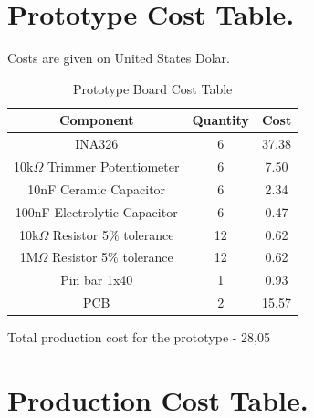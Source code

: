 \chapter{Prototype Cost Table.}

Costs are given on United States Dolar.\\
\begin{table}[htb]
  \begin{center}
    \ABNTEXreducedfont
    \caption[Prototype Board Cost Table]{Prototype Board Cost Table}
    \label{Prototype-cost}
    \begin{tabular}{c|c|c}
      \textbf{Component} & \textbf{Quantity} & \textbf{Cost} \\
    \hline
    \hline
    INA326 & 6 & 37.38\\ \hline
    10k$\Omega$ Trimmer Potentiometer & 6 & 7.50 \\ \hline
    10nF Ceramic Capacitor & 6 & 2.34 \\ \hline
    100nF Electrolytic Capacitor & 6 & 0.47 \\ \hline
    10k$\Omega$ Resistor 5$\%$ tolerance & 12 & 0.62 \\ \hline
    1M$\Omega$ Resistor 5$\%$ tolerance & 12 & 0.62 \\ \hline
    Pin bar 1x40 & 1 & 0.93 \\ \hline
    PCB & 2 & 15.57 \\ \hline
  \end{tabular}
\end{center}
\end{table}

Total production cost for the prototype - 28,05

\chapter{Production Cost Table.}

